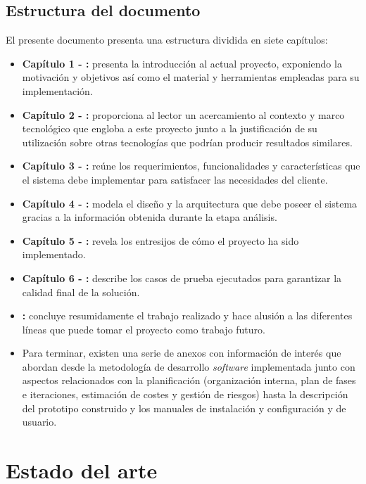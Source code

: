 \documentclass[12pt,a4paper, twoside]{report}
\begin{document}
	\section{Estructura del documento}

	El presente documento presenta una estructura dividida en siete capítulos: 
		
	\begin{itemize}
		\item \textbf{Capítulo 1 - :} presenta la introducción al actual proyecto, exponiendo la motivación y objetivos así como el material y herramientas empleadas para su implementación.		
		\item \textbf{Capítulo 2 - :} proporciona al lector un acercamiento al contexto y marco tecnológico que engloba a este proyecto junto a la justificación de su utilización sobre otras tecnologías que podrían producir resultados similares.		
		\item \textbf{Capítulo 3 - :} reúne los requerimientos, funcionalidades y características que el sistema debe implementar para satisfacer las necesidades del cliente.
		\item \textbf{Capítulo 4 - :} modela el diseño y la arquitectura que debe poseer el sistema gracias a la información obtenida durante la etapa análisis. 
		\item \textbf{Capítulo 5 - :} revela los entresijos de cómo el proyecto ha sido implementado.
		\item \textbf{Capítulo 6 - :} describe los casos de prueba ejecutados para garantizar la calidad final de la solución.
		\item \textbf{:} concluye resumidamente el trabajo realizado y hace alusión a las diferentes líneas que puede tomar el proyecto como trabajo futuro.	 
		\item Para terminar, existen una serie de anexos con información de interés que abordan desde la metodología de desarrollo \textit{software} implementada junto con aspectos relacionados con la planificación (organización interna, plan de fases e iteraciones, estimación de costes y gestión de riesgos) hasta la descripción del \gls{prototipo} construido y los manuales de instalación y configuración y de usuario.		
	\end{itemize}
	
	\chapter{Estado del arte} \label{stateArtChapter}
	
\end{document}
